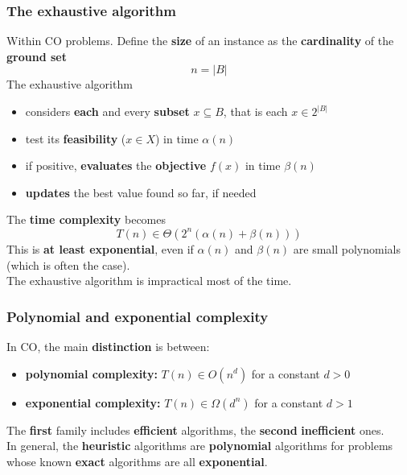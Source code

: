 \newpage

\subsubsection{The exhaustive algorithm}
Within CO problems. Define the \textbf{size} of an instance as the \textbf{cardinality} of the \textbf{ground set}
$$ n = |B| $$
The exhaustive algorithm
\begin{itemize}
	\item considers \textbf{each} and every \textbf{subset} $x \subseteq B$, that is each $x \in 2^{|B|}$
	\item test its \textbf{feasibility} ($x \in X$) in time $\alpha (n)$
	\item if positive, \textbf{evaluates} the \textbf{objective} $f(x)$ in time $\beta(n)$
	\item \textbf{updates} the best value found so far, if needed
\end{itemize}
The \textbf{time complexity} becomes
$$ T(n) \in \Theta \left(2^n \left(\alpha (n) + \beta (n)\right)\right) $$
This is \textbf{at least exponential}, even if $\alpha (n)$ and $\beta(n)$ are small polynomials (which is often the case).\\

The exhaustive algorithm is impractical most of the time.

\subsubsection{Polynomial and exponential complexity}
In CO, the main \textbf{distinction} is between: 
\begin{itemize}
	\item \textbf{polynomial complexity:} $T(n) \in O (n^d)$ for a constant $d > 0$
	\item \textbf{exponential complexity:} $T(n) \in \Omega(d^n)$ for a constant $d > 1$
\end{itemize}
The \textbf{first} family includes \textbf{efficient} algorithms, the \textbf{second} \textbf{inefficient} ones.\\

In general, the \textbf{heuristic} algorithms are \textbf{polynomial} algorithms for problems whose known \textbf{exact} algorithms are all \textbf{exponential}.\\

\newpage

